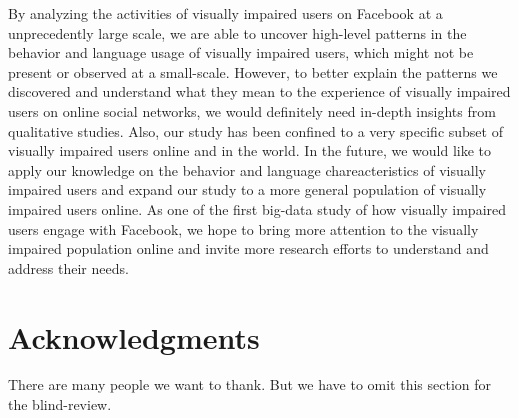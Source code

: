 \documentclass{sigchi}
\begin{document}
By analyzing the activities of visually impaired users on Facebook at a unprecedently large scale, we are able to uncover high-level patterns in the behavior and language usage of visually impaired users, which might not be present or observed at a small-scale.  However, to better explain the patterns we discovered and understand what they mean to the experience of visually impaired users on online social networks, we would definitely need in-depth insights from qualitative studies. Also, our study has been confined to a very specific subset of visually impaired users online and in the world. In the future, we would like to apply our knowledge on the behavior and language chareacteristics of visually impaired users and expand our study to a more general population of visually impaired users online. As one of the first big-data study of how visually impaired users engage with Facebook, we hope to bring more attention to the visually impaired population online and invite more research efforts to understand and address their needs. 













\section{Acknowledgments}
There are many people we want to thank. But we have to omit this section for the blind-review. 
\end{document}
